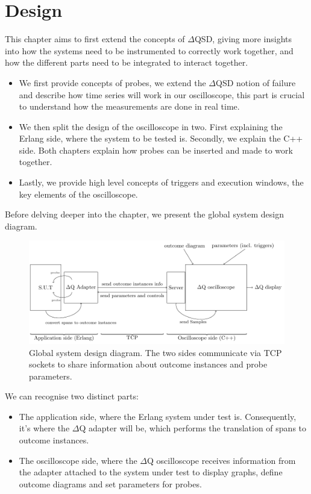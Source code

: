 \chapter{Design}
    This chapter aims to first extend the concepts of $\Delta$QSD, giving more insights into how the systems need to be instrumented to correctly work together, and how the different parts need to be integrated to interact together.
    \begin{itemize}
        \item We first provide concepts of probes, we extend the $\Delta$QSD notion of failure and describe how time series will work in our oscilloscope, this part is crucial to understand how the measurements are done in real time.
        \item We then split the design of the oscilloscope in two. First explaining the Erlang side, where the system to be tested is. Secondly, we explain the C++ side. Both chapters explain how probes can be inserted and made to work together.
        \item Lastly, we provide high level concepts of triggers and execution windows, the key elements of the oscilloscope. 
    \end{itemize}

    Before delving deeper into the chapter, we present the global system design diagram.

    \begin{figure}[H]
        \begin{center}
            \includegraphics[width=\textwidth]{tikz/sut-stub-osc.pdf}
        \end{center}
        \caption{Global system design diagram. The two sides communicate via TCP sockets to share information about outcome instances and probe parameters.}
    \end{figure}

    We can recognise two distinct parts:
    \begin{itemize}
        \item The application side, where the Erlang system under test is. Consequently, it's where the $\Delta$Q adapter will be, which performs the translation of spans to outcome instances.
        \item The oscilloscope side, where the $\Delta$Q oscilloscope receives information from the adapter attached to the system under test to display graphs, define outcome diagrams and set parameters for probes.
    \end{itemize}


